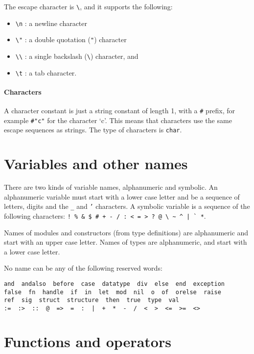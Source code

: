 \documentclass[12pt,a4paper]{book}
\begin{document}
The escape character is \verb|\|, and it supports the following:
\begin{itemize}
\item
\verb|\n| : a newline character
\item
\verb|\"| : a double quotation (\texttt{"}) character
\item
\verb|\\| : a single backslash (\verb|\|) character, and
\item
\verb|\t| : a tab character.
\end{itemize}


\paragraph{Characters} A character constant is just a string constant of length
1, with a \texttt{\#} prefix, for example \texttt{\#"c"} for the character `c'.
This means that characters use the same escape sequences as strings. The type
of characters is \texttt{char}.


\section{Variables and other names}

There are two kinds of variable names, alphanumeric and symbolic. An alphanumeric variable must start
with a lower case letter and be a sequence of letters, digits and the \texttt{\_} and \texttt{'} characters. A symbolic variable is a sequence of the following characters: \verb)! % & $ # + - / : < = > ? @ \ ~ ^ | ` *).

Names of modules and constructors (from type definitions) are alphanumeric and
start with an upper case letter. Names of types are alphanumeric, and start
with a lower case letter.

No name can be any of the following reserved words:
\begin{verbatim}
and  andalso  before  case  datatype  div  else  end  exception
false  fn  handle  if  in  let  mod  nil  o  of  orelse  raise
ref  sig  struct  structure  then  true  type  val
:=  :>  ::  @  =>  =  :  |  +  *  -  /  <  >  <=  >=  <>
\end{verbatim}

\section{Functions and operators}
\end{document}
